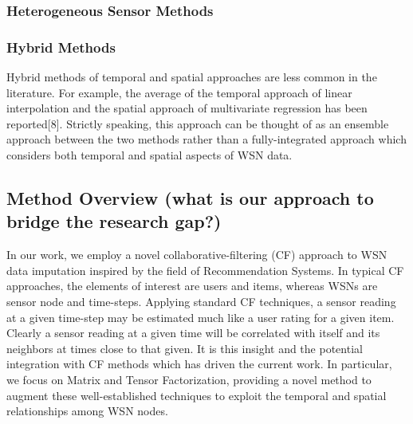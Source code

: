 \subsubsection{Heterogeneous Sensor Methods}

\subsubsection{Hybrid Methods}
Hybrid methods of temporal and spatial approaches are less common in the literature.
For example, the average of the temporal approach of linear interpolation and the spatial approach of multivariate regression has been reported[8].
Strictly speaking, this approach can be thought of as an ensemble approach between the two methods rather than a fully-integrated approach which considers both temporal and spatial aspects of WSN data.


\subsection{Method Overview (what is our approach to bridge the research gap?)}
In our work, we employ a novel collaborative-filtering (CF) approach to WSN data imputation inspired by the field of Recommendation Systems.
In typical CF approaches, the elements of interest are users and items, whereas WSNs are sensor node and time-steps.
Applying standard CF techniques, a sensor reading at a given time-step may be estimated much like a user rating for a given item.
Clearly a sensor reading at a given time will be correlated with itself and its neighbors at times close to that given.
It is this insight and the potential integration with CF methods which has driven the current work.
In particular, we focus on Matrix and Tensor Factorization, providing a novel method to augment these well-established techniques to exploit the temporal and spatial relationships among WSN nodes.

